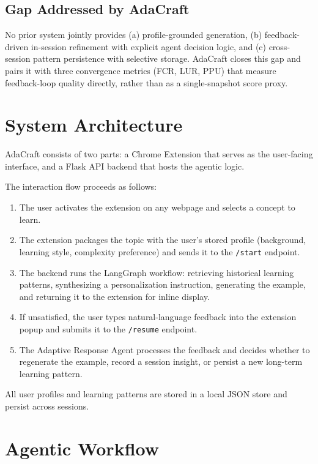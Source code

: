 \documentclass[conference]{IEEEtran}
\begin{document}
\subsection{Gap Addressed by AdaCraft}

No prior system jointly provides (a) profile-grounded generation, (b) feedback-driven in-session refinement with explicit agent decision logic, and (c) cross-session pattern persistence with selective storage. AdaCraft closes this gap and pairs it with three convergence metrics (FCR, LUR, PPU) that measure feedback-loop quality directly, rather than as a single-snapshot score proxy.

\section{System Architecture}
\label{sec:system}

AdaCraft consists of two parts: a Chrome Extension that serves as the user-facing interface, and a Flask API backend that hosts the agentic logic.

The interaction flow proceeds as follows:
\begin{enumerate}
    \item The user activates the extension on any webpage and selects a concept to learn.
    \item The extension packages the topic with the user's stored profile (background, learning style, complexity preference) and sends it to the \texttt{/start} endpoint.
    \item The backend runs the LangGraph workflow: retrieving historical learning patterns, synthesizing a personalization instruction, generating the example, and returning it to the extension for inline display.
    \item If unsatisfied, the user types natural-language feedback into the extension popup and submits it to the \texttt{/resume} endpoint.
    \item The Adaptive Response Agent processes the feedback and decides whether to regenerate the example, record a session insight, or persist a new long-term learning pattern.
\end{enumerate}
All user profiles and learning patterns are stored in a local JSON store and persist across sessions.

\section{Agentic Workflow}
\label{sec:workflow}
\end{document}
